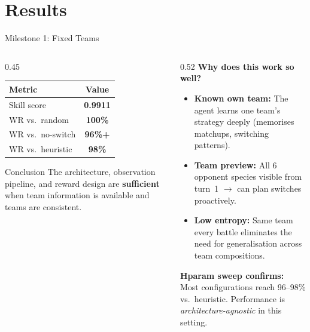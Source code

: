 \documentclass[aspectratio=169, 11pt]{beamer}
\begin{document}
\section{Results}

\begin{frame}{Milestone 1: Fixed Teams}
  \begin{columns}[T]
    \begin{column}{0.45\textwidth}
      \begin{center}
        \begin{tabularx}{\textwidth}{l c}
          \toprule
          \textbf{Metric} & \textbf{Value} \\
          \midrule
          Skill score        & \textbf{0.9911} \\
          WR vs.\ random     & \textbf{100\%} \\
          WR vs.\ no-switch  & \textbf{96\%+} \\
          WR vs.\ heuristic  & \textbf{98\%} \\
          \bottomrule
        \end{tabularx}
      \end{center}

      \vspace{0.5em}
      \begin{exampleblock}{Conclusion}
        The architecture, observation pipeline, and reward design are
        \textbf{sufficient} when team information is available and teams
        are consistent.
      \end{exampleblock}
    \end{column}

    \begin{column}{0.52\textwidth}
      \textbf{Why does this work so well?}
      \begin{itemize}\setlength{\itemsep}{0.3em}
        \item \textbf{Known own team:} The agent learns one team's
              strategy deeply (memorises matchups, switching patterns).
        \item \textbf{Team preview:} All 6 opponent species visible from
              turn~1 $\to$ can plan switches proactively.
        \item \textbf{Low entropy:} Same team every battle eliminates
              the need for generalisation across team compositions.
      \end{itemize}

      \vspace{0.3em}
      \textbf{Hparam sweep confirms:}\\
      Most configurations reach 96--98\% vs.\ heuristic. Performance is
      \emph{architecture-agnostic} in this setting.
    \end{column}
  \end{columns}
\end{frame}
\end{document}
